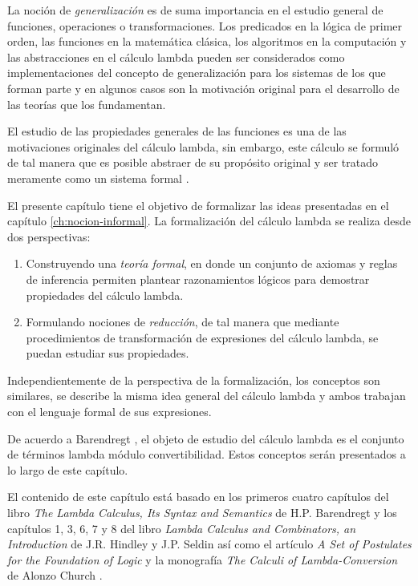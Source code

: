 La noción de \emph{generalización} es de suma importancia en el estudio general de funciones, operaciones o transformaciones. Los predicados en la lógica de primer orden, las funciones en la matemática clásica, los algoritmos en la computación y las abstracciones en el cálculo lambda pueden ser considerados como implementaciones del concepto de generalización para los sistemas de los que forman parte y en algunos casos son la motivación original para el desarrollo de las teorías que los fundamentan.

El estudio de las propiedades generales de las funciones es una de las motivaciones originales del cálculo lambda, sin embargo, este cálculo se formuló de tal manera que es posible abstraer de su propósito original y ser tratado meramente como un sistema formal \cite{Church:LambdaConversion}.

El presente capítulo tiene el objetivo de formalizar las ideas presentadas en el capítulo \ref{ch:nocion-informal}. La formalización del cálculo lambda se realiza desde dos perspectivas:

\begin{enumerate}
\item Construyendo una \emph{teoría formal}, en donde un conjunto de axiomas y reglas de inferencia permiten plantear razonamientos lógicos para demostrar propiedades del cálculo lambda.
\item Formulando nociones de \emph{reducción}, de tal manera que mediante procedimientos de transformación de expresiones del cálculo lambda, se puedan estudiar sus propiedades.
\end{enumerate}

Independientemente de la perspectiva de la formalización, los conceptos son similares, se describe la misma idea general del cálculo lambda y ambos trabajan con el lenguaje formal de sus expresiones.

De acuerdo a Barendregt \cite[p.~22]{Barendregt:Bible}, el objeto de estudio del cálculo lambda es el conjunto de términos lambda módulo convertibilidad. Estos conceptos serán presentados a lo largo de este capítulo.

El contenido de este capítulo está basado en los primeros cuatro capítulos del libro \emph{The Lambda Calculus, Its Syntax and Semantics} de H.P. Barendregt \cite{Barendregt:Bible} y los capítulos 1, 3, 6, 7 y 8 del libro \emph{Lambda Calculus and Combinators, an Introduction} de J.R. Hindley y J.P. Seldin \cite{HindleySeldin:LambdaCalculusAndCombinators} así como el artículo \emph{A Set of Postulates for the Foundation of Logic} y la monografía \emph{The Calculi of Lambda-Conversion} de Alonzo Church \cite{Church:FoundationsLogic,Church:LambdaConversion}.

